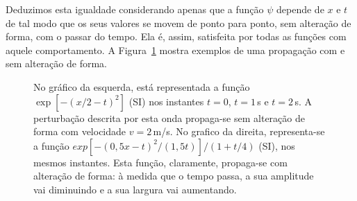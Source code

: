 Deduzimos esta igualdade considerando apenas que a função $\psi$ depende de $x$ e
$t$ de tal modo que os seus valores se movem de ponto para ponto, sem alteração
de forma, com o passar do tempo. Ela é, assim, satisfeita por todas as funções
com aquele comportamento. A Figura~\ref{fig:f060} mostra exemplos de uma
propagação com e sem alteração de forma.
\begin{figure}[htb]
  {\centering
    \par
  }
  \caption{No gráfico da esquerda, está representada a função $\exp[-(x/2-t)^2]$
    (SI)
    nos instantes $t=0$, $t=1$\,s e $t=2$\,s. A perturbação descrita por esta
    onda propaga-se sem alteração de forma com velocidade $v=2$\,m/s. No grafico
    da direita, representa-se a função $exp[-(0,5x-t)^2/(1,5t)]/(1+t/4)$ (SI),
    nos mesmos instantes. Esta função, claramente, propaga-se com alteração de
    forma: à medida que o tempo passa, a sua amplitude vai diminuindo e a sua
  largura vai aumentando.\label{fig:f060}}
\end{figure}

